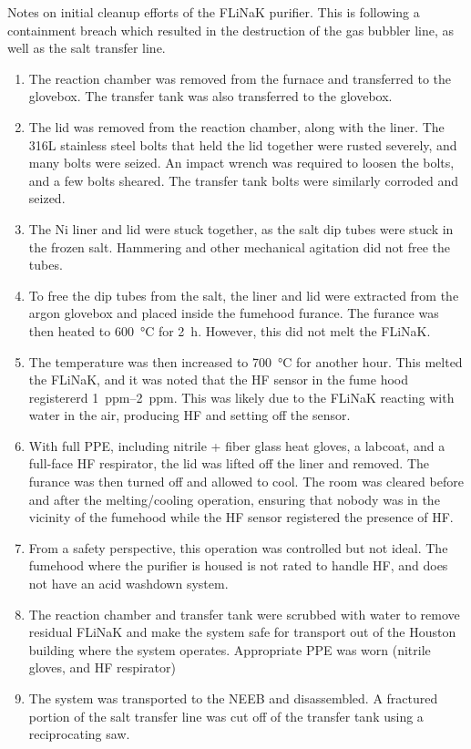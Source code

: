 Notes on initial cleanup efforts of the FLiNaK purifier. This is
following a containment breach
which resulted in the destruction of the gas bubbler line, as well as
the salt transfer line.
\begin{enumerate}
  \item The reaction chamber was removed from the furnace and
    transferred to the
    glovebox. The transfer tank was also transferred to the glovebox.
  \item The lid was removed from the reaction chamber, along with the
    liner. The 316L stainless steel
    bolts that held the lid together were rusted severely, and many
    bolts were seized. An impact wrench was
    required to loosen the bolts, and a few bolts sheared. The
    transfer tank bolts were similarly corroded and
    seized.
  \item  The Ni liner and lid were stuck together, as the salt dip
    tubes were stuck in the
    frozen salt. Hammering and other mechanical agitation did not
    free the tubes.
  \item To free the dip tubes from the salt, the liner and lid were
    extracted from the argon glovebox and placed inside
    the fumehood furance. The furance was then heated to
    \SI{600}{\celsius} for \SI{2}{\hour}. However, this did not
    melt the FLiNaK.
  \item The temperature was then increased to \SI{700}{\celsius} for
    another hour.
    This melted the FLiNaK, and it was noted that the HF sensor in
    the fume hood registererd
    \qtyrange{1}{2}{ppm}. This was likely due to the FLiNaK reacting
    with water in the air, producing HF and setting off the sensor.
  \item With full PPE, including nitrile + fiber glass heat gloves, a
    labcoat, and a
    full-face HF respirator, the lid was lifted off the liner and
    removed. The furance was then turned off and
    allowed to cool. The room was cleared before and after the
    melting/cooling operation, ensuring that
    nobody was in the vicinity of the fumehood while the HF sensor
    registered the presence of HF.
  \item From a safety perspective, this operation was controlled but
    not ideal. The fumehood where the
    purifier is housed is not rated to handle HF, and does not have
    an acid washdown system.
  \item The reaction chamber and transfer tank were scrubbed with
    water to remove residual FLiNaK and make the system safe for transport
    out of the Houston building where the system operates. Appropriate PPE was
    worn (nitrile gloves, and HF respirator)
  \item The system was transported to the NEEB and disassembled. A
    fractured portion of the salt
    transfer line was cut off of the transfer tank using a reciprocating saw.


\end{enumerate}
